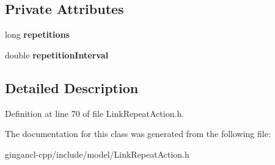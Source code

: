 \subsection*{Private Attributes}
\begin{CompactItemize}
\item 
long {\bf repetitions}\label{classbr_1_1pucrio_1_1telemidia_1_1ginga_1_1ncl_1_1model_1_1link_1_1LinkRepeatAction_854b086d24df592a5cb60cdaa01c54a0}

\item 
double {\bf repetitionInterval}\label{classbr_1_1pucrio_1_1telemidia_1_1ginga_1_1ncl_1_1model_1_1link_1_1LinkRepeatAction_fc3516338462c7cb1df417e2816e21b8}

\end{CompactItemize}


\subsection{Detailed Description}




Definition at line 70 of file LinkRepeatAction.h.

The documentation for this class was generated from the following file:\begin{CompactItemize}
\item 
gingancl-cpp/include/model/LinkRepeatAction.h\end{CompactItemize}
